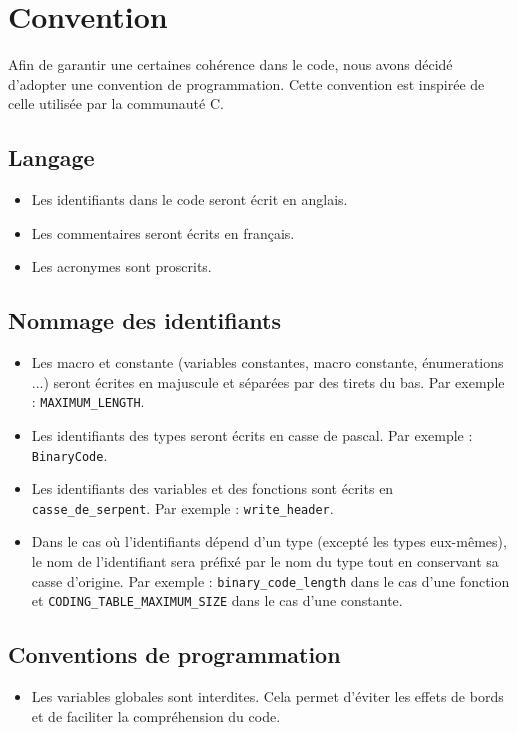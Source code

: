 \section{Convention}

Afin de garantir une certaines cohérence dans le code, nous avons décidé d'adopter une convention de programmation.
Cette convention est inspirée de celle utilisée par la communauté C.

\subsection{Langage}

\begin{itemize}
    \item Les identifiants dans le code seront écrit en anglais.
    \item Les commentaires seront écrits en français.
    \item Les acronymes sont proscrits.
\end{itemize}

\subsection{Nommage des identifiants}

\begin{itemize}
    \item Les macro et constante (variables constantes, macro constante, énumerations ...) seront écrites en majuscule et séparées par des tirets du bas. Par exemple : \texttt{MAXIMUM\_LENGTH}.
    \item Les identifiants des types seront écrits en casse de pascal. Par exemple : \texttt{BinaryCode}.
    \item Les identifiants des variables et des fonctions sont écrits en \texttt{casse\_de\_serpent}. Par exemple : \texttt{write\_header}.
    \item Dans le cas où l'identifiants dépend d'un type (excepté les types eux-mêmes), le nom de l'identifiant sera préfixé par le nom du type tout en conservant sa casse d'origine.
    Par exemple : \texttt{binary\_code\_length} dans le cas d'une fonction et \texttt{CODING\_TABLE\_MAXIMUM\_SIZE} dans le cas d'une constante.
\end{itemize}

\subsection{Conventions de programmation}

\begin{itemize}
    \item Les variables globales sont interdites. Cela permet d'éviter les effets de bords et de faciliter la compréhension du code.
\end{itemize}